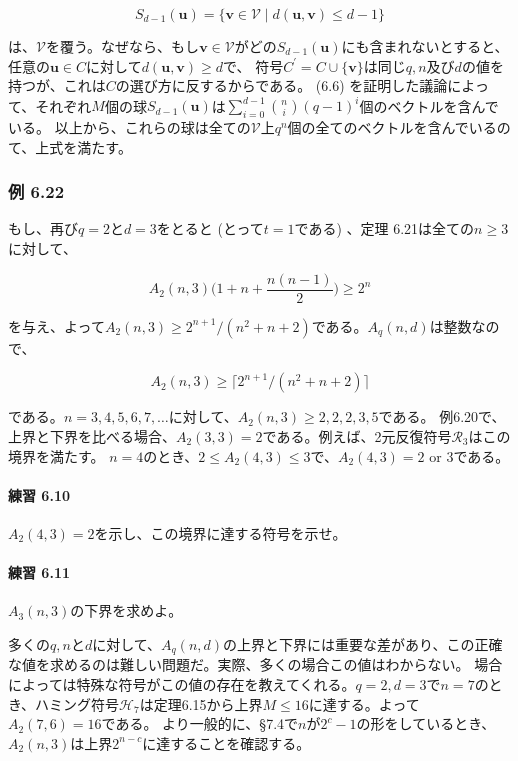 \documentclass[12pt,a4paper]{article}
\begin{document}
      \[ S_{d - 1} (\mathbf{u}) = \lbrace \mathbf{v} \in \mathcal{V} \mid d(\mathbf{u}, \mathbf{v}) \leq d - 1 \rbrace \]

      は、$\mathcal{V}$を覆う。なぜなら、もし$\mathbf{v} \in \mathcal{V}$がどの$S_{d - 1} (\mathbf{u})$にも含まれないとすると、任意の$\mathbf{u} \in C$に対して$d (\mathbf{u}, \mathbf{v}) \geq d$で、
      符号$C^\prime = C \cup \lbrace \mathbf{v} \rbrace$は同じ$q, n$及び$d$の値を持つが、これは$C$の選び方に反するからである。
      (6.6) を証明した議論によって、それぞれ$M$個の球$S_{d-1}(\mathbf{u})$は$\sum_{i=0}^{d-1}\binom ni {(q - 1)}^i$個のベクトルを含んでいる。
      以上から、これらの球は全ての$\mathcal{V}$上$q^n$個の全てのベクトルを含んでいるのて、上式を満たす。

    \subsubsection*{例 6.22}
      もし、再び$q = 2$と$d = 3$をとると (とって$t = 1$である) 、定理 6.21は全ての$n \geq 3$に対して、
      
      \[ A_2 (n, 3) \big( 1 + n + \frac{n(n - 1)}{2} \big) \geq 2^n \]

      を与え、よって$A_2(n,3) \geq 2^{n+1} / (n^2 + n + 2) $である。$A_q (n, d)$は整数なので、

      \[A_2 (n, 3) \geq \lceil 2^{n + 1} / (n^2 + n + 2) \rceil \]

      である。$n = 3, 4, 5, 6, 7, \ldots$に対して、$A_2 (n, 3) \geq 2, 2, 2, 3, 5$である。
      例6.20で、上界と下界を比べる場合、$A_2(3, 3) = 2$である。例えば、2元反復符号$\mathcal{R}_3$はこの境界を満たす。
      $n = 4$のとき、$2 \leq A_2 (4, 3) \leq 3$で、$A_2(4, 3) = 2 \text{ or } 3$である。
      
      \paragraph{練習 6.10}
        $A_2 (4, 3) = 2$を示し、この境界に達する符号を示せ。

      \paragraph{練習 6.11}
        $A_3 (n, 3)$の下界を求めよ。

        多くの$q, n$と$d$に対して、$A_q (n, d)$の上界と下界には重要な差があり、この正確な値を求めるのは難しい問題だ。実際、多くの場合この値はわからない。
        場合によっては特殊な符号がこの値の存在を教えてくれる。$q = 2, d = 3$で$n = 7$のとき、ハミング符号$\mathcal{H}_7$は定理6.15から上界$M \leq 16$に達する。よって$A_2 (7, 6) = 16$である。
        より一般的に、\S 7.4で$n$が$2^c - 1$の形をしているとき、$A_2(n, 3)$は上界$2^{n - c}$に達することを確認する。
\end{document}
